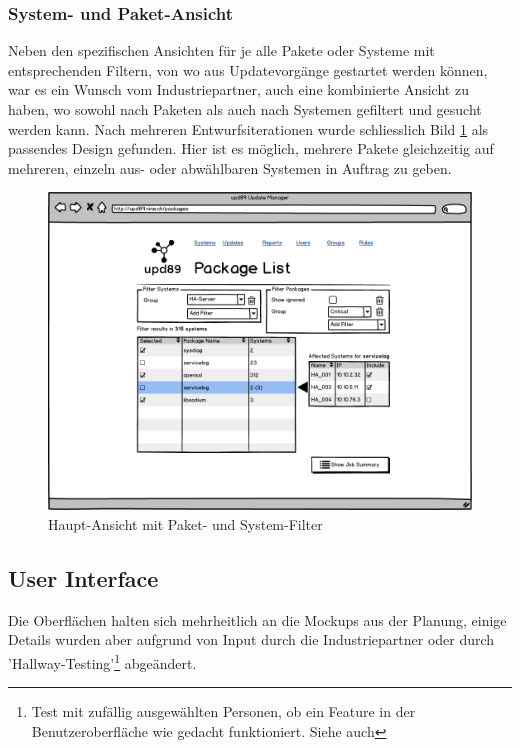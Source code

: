 \subsubsection*{System- und Paket-Ansicht}

Neben den spezifischen Ansichten für je alle Pakete oder Systeme mit entsprechenden Filtern, von wo aus Updatevorgänge gestartet werden können, war es ein Wunsch vom Industriepartner, auch eine kombinierte Ansicht zu haben, wo sowohl nach Paketen als auch nach Systemen gefiltert und gesucht werden kann. Nach mehreren Entwurfsiterationen wurde schliesslich Bild \ref{fig:design:combo_view_mockup} als passendes Design gefunden. Hier ist es möglich, mehrere Pakete gleichzeitig auf mehreren, einzeln aus- oder abwählbaren Systemen in Auftrag zu geben.

\begin{figure}[H]
	\centering
	\includegraphics[width=\linewidth]{files/mockups/combo_view}
	\caption{Haupt-Ansicht mit Paket- und System-Filter}
	\label{fig:design:combo_view_mockup}
\end{figure}

\subsection*{User Interface}

Die Oberflächen halten sich mehrheitlich an die Mockups aus der Planung, einige Details wurden aber aufgrund von Input durch die Industriepartner oder durch 'Hallway-Testing'\footnote{Test mit zufällig ausgewählten Personen, ob ein Feature in der Benutzeroberfläche wie gedacht funktioniert. Siehe auch } abgeändert.

